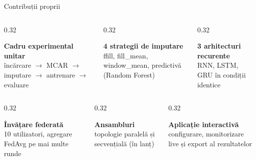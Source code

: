 \documentclass[aspectratio=169, 11pt]{beamer}
\begin{document}
\begin{frame}{Contribuții proprii}
  \begin{columns}[t]
    \begin{column}{0.32\textwidth}
      \begin{card}\small\textbf{Cadru experimental unitar}\\ încărcare $\rightarrow$ MCAR $\rightarrow$ imputare $\rightarrow$ antrenare $\rightarrow$ evaluare\end{card}
    \end{column}
    \begin{column}{0.32\textwidth}
      \begin{card}\small\textbf{4 strategii de imputare}\\ ffill, fill\_mean, window\_mean, predictivă (Random Forest)\end{card}
    \end{column}
    \begin{column}{0.32\textwidth}
      \begin{card}\small\textbf{3 arhitecturi recurente}\\ RNN, LSTM, GRU în condiții identice\end{card}
    \end{column}
  \end{columns}
  \vspace{0.5em}
  \begin{columns}[t]
    \begin{column}{0.32\textwidth}
      \begin{card}\small\textbf{Învățare federată}\\ 10 utilizatori, agregare FedAvg pe mai multe runde\end{card}
    \end{column}
    \begin{column}{0.32\textwidth}
      \begin{card}\small\textbf{Ansambluri}\\ topologie paralelă și secvențială (în lanț)\end{card}
    \end{column}
    \begin{column}{0.32\textwidth}
      \begin{card}\small\textbf{Aplicație interactivă}\\ configurare, monitorizare live și export al rezultatelor\end{card}
    \end{column}
  \end{columns}
\end{frame}
\end{document}
